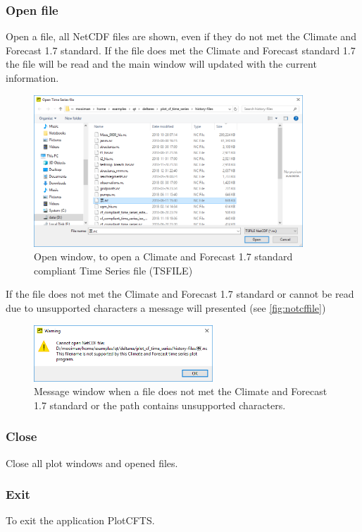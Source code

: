 \documentclass{deltares_memo}
\newcommand{\plotcfts}{PlotCFTS\xspace}
\newcommand{\netcdf}{NetCDF\xspace}
\newcommand{\cfstandard}{Climate and Forecast 1.7 standard\xspace}
\begin{document}
\subsubsection{Open file}
Open a file, all \netcdf files are shown, even if they do not met the \cfstandard.
If the file does met the Climate and Forecast standard 1.7 the file will be read and the main window will updated with the current information. 
%
\begin{figure}[H]
    \centering    
    \includegraphics[width=0.9\textwidth]{pictures/menu_file_open.png}
    \caption{Open window, to open a \cfstandard compliant Time Series file (TSFILE)}
\end{figure}

If the file does not met the \cfstandard or cannot be read due to unsupported characters a message will presented (see \autoref{fig:notcffile})
\begin{figure}[H]
    \centering    
    \includegraphics[width=0.6\textwidth]{pictures/message_not_cf_file.png}
    \caption{Message window when a file does not met the \cfstandard or the path contains unsupported characters.\label{fig:notcffile}}
\end{figure}

\subsubsection{Close}
Close all plot windows and opened files.

\subsubsection{Exit}
To exit the application \plotcfts.
\end{document}
